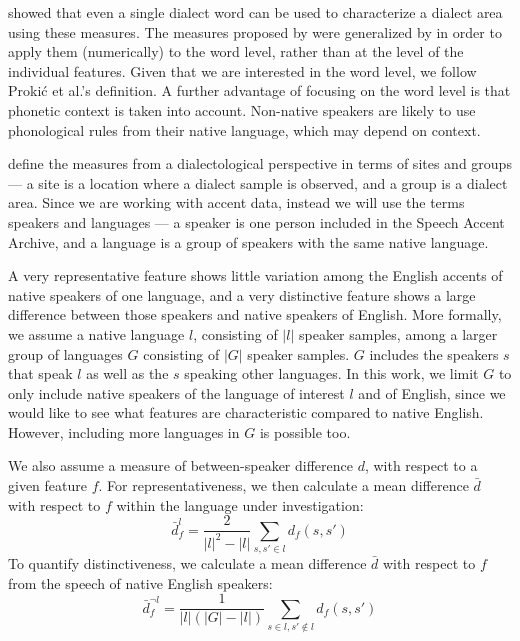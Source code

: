 \documentclass[output=paper]{LSP/langsci}
\begin{document}
\citet{prokic_detecting_2012} showed that even a single dialect word can be used to characterize a dialect area using these measures. The measures proposed by \citet{wieling_bipartite_2011} were generalized by \citet{prokic_detecting_2012} in order to apply them (numerically) to the word level, rather than at the level of the individual features. Given that we are interested in the word level, we follow Proki\'{c} et al.'s definition. A further advantage of focusing on the word level is that phonetic context is taken into account. Non-native speakers are likely to use phonological rules from their native language, which may depend on context.

\citet{prokic_detecting_2012} define the measures from a dialectological perspective in terms of sites and groups --- a site is a location where a dialect sample is observed, and a group is a dialect area. Since we are working with accent data, instead we will use the terms speakers and languages --- a speaker is one person included in the Speech Accent Archive, and a language is a group of speakers with the same native language.

A very representative feature shows little variation among the English accents of native speakers of one language, and a very distinctive feature shows a large difference between those speakers and native speakers of English. More formally, we assume a native language $l$, consisting of $|l|$ speaker samples, among a larger group of languages $G$ consisting of $|G|$ speaker samples. $G$ includes the speakers $s$ that speak $l$ as well as the $s$ speaking other languages. In this work, we limit $G$ to only include native speakers of the language of interest $l$ and of English, since we would like to see what features are characteristic compared to native English. However, including more languages in $G$ is possible too.

We also assume a measure of between-speaker difference $d$, with respect to a given feature $f$. For representativeness, we then calculate a mean difference $\bar{d}$ with respect to $f$ within the language under investigation:
\begin{equation}
\bar{d}^l_f = \frac{2}{|l|^2 - |l|} \sum_{s,s' \in l} d_f(s,s')
\end{equation}
To quantify distinctiveness, we calculate a mean difference $\bar{d}$ with respect to $f$ from the speech of native English speakers:
\begin{equation}
\bar{d}^{\neg l}_f = \frac{1}{|l|(|G| - |l|)} \sum_{s \in l,s' \notin l} d_f(s,s')
\end{equation}
\end{document}
